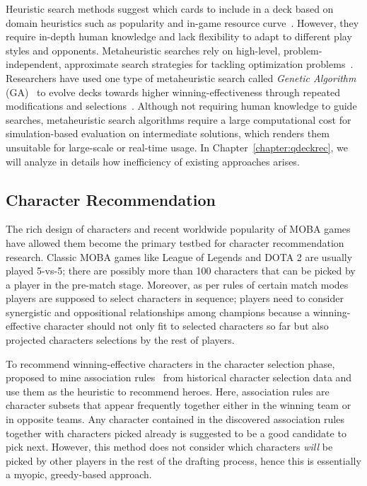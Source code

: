 Heuristic search methods suggest which cards to include in a deck based on domain heuristics such as popularity and in-game resource curve~\cite{frankkarsten,willfancher,stiegler2016hearthstone}. However, they require in-depth human knowledge and lack flexibility to adapt to different play styles and opponents. Metaheuristic searches rely on high-level, problem-independent, approximate search strategies for tackling optimization problems~\cite{birattari2009tuning}. Researchers have used one type of metaheuristic search called \textit{Genetic Algorithm} (GA)~\cite{holland1992adaptation} to evolve decks towards higher winning-effectiveness through repeated modifications and selections~\cite{garcia2016evolutionary,bjorke2017deckbuilding}. Although  not requiring human knowledge to guide searches, metaheuristic search algorithms require a large computational cost for simulation-based evaluation on intermediate solutions, which renders them unsuitable for large-scale or real-time usage. In Chapter~\ref{chapter:qdeckrec}, we will analyze in details how inefficiency of existing approaches arises. 

\subsection{Character Recommendation}
The rich design of characters and recent worldwide popularity of MOBA games have allowed them become the primary testbed for character recommendation research. Classic MOBA games like League of Legends and DOTA 2 are usually played 5-vs-5; there are possibly more than 100 characters that can be picked by a player in the pre-match stage. Moreover, as per rules of certain match modes players are supposed to select characters in sequence; players need to consider synergistic and oppositional relationships among champions because a winning-effective character should not only fit to selected characters so far but also projected characters selections by the rest of players. 

To recommend winning-effective characters in the character selection phase, \cite{hanke2017reco} proposed to mine association rules~\cite{agrawal1994fast} from historical character selection data and use them as the heuristic to recommend heroes. Here, association rules are character subsets that appear frequently together either in the winning team or in opposite teams. Any character contained in the discovered association rules together with characters picked already is suggested to be a good candidate to pick next. However, this method does not consider which characters \textit{will} be picked  by other players in the rest of the drafting process, hence this is essentially a myopic, greedy-based approach.


